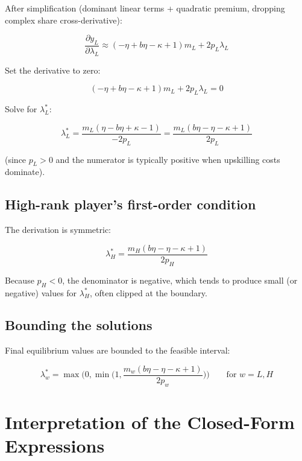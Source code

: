 \documentclass[11pt]{article}
\begin{document}
After simplification (dominant linear terms + quadratic premium, dropping complex share cross-derivative):

\[
\frac{\partial y_L}{\partial \lambda_L} \approx (- \eta + b \eta - \kappa + 1) m_L + 2 p_L \lambda_L
\]

Set the derivative to zero:

\[
(- \eta + b \eta - \kappa + 1) m_L + 2 p_L \lambda_L = 0
\]

Solve for $\lambda_L^*$:

\[
\lambda_L^* = \frac{ m_L (\eta - b \eta + \kappa - 1) }{-2 p_L}
= \frac{ m_L (b \eta - \eta - \kappa + 1) }{2 p_L}
\]

(since $p_L > 0$ and the numerator is typically positive when upskilling costs dominate).

\subsection{High-rank player's first-order condition}

The derivation is symmetric:

\[
\lambda_H^* = \frac{ m_H (b \eta - \eta - \kappa + 1) }{2 p_H}
\]

Because $p_H < 0$, the denominator is negative, which tends to produce small (or negative) values for $\lambda_H^*$, often clipped at the boundary.

\subsection{Bounding the solutions}

Final equilibrium values are bounded to the feasible interval:

\[
\lambda_w^* = \max\bigl(0, \min\bigl(1, \dfrac{m_w (b \eta - \eta - \kappa + 1)}{2 p_w}\bigr)\bigr)
\qquad \text{for } w = L, H
\]

\section{Interpretation of the Closed-Form Expressions}
\end{document}
